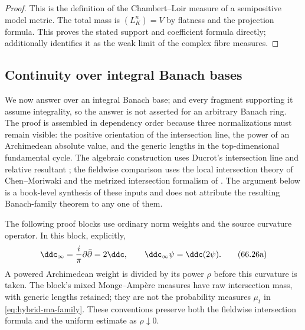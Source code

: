 \begin{proof}
This is the definition of the Chambert--Loir measure of a semipositive
model metric. The total mass is $(L_K^n)=V$ by flatness and the
projection formula. This proves the stated support and coefficient
formula directly;  additionally
identifies it as the weak limit of the complex fibre measures.
\end{proof}

\subsection{Continuity over integral Banach bases}
\label{sec:hybrid-banach-family-ma}

We now answer \cite[Question~4.9]{PS23Hybrid} over an integral Banach
base;  and every fragment supporting it assume
integrality, so the answer is not asserted for an arbitrary Banach ring.
The proof is assembled in dependency order because three normalizations
must remain visible: the positive orientation of the intersection line,
the power of an Archimedean absolute value, and the generic lengths in the
top-dimensional fundamental cycle.  The algebraic construction uses
Ducrot's intersection line and relative resultant
\cite{Ducrot97CubeIntersection}; the fieldwise comparison uses the local
intersection theory of Chen--Moriwaki
\cite{ChenMoriwaki21AdelicIntersection} and the metrized intersection
formalism of \cite{BE21}.  The argument below is a book-level synthesis of
these inputs and does not attribute the resulting Banach-family theorem to
any one of them.

The following proof blocks use ordinary norm weights and the source
curvature operator. In this block, explicitly,
\[
 \ddc_\infty=\frac{i}{\pi}\partial\bar\partial=2\ddc,
 \qquad \ddc_\infty\psi=\ddc(2\psi).
\tag{66.26a}\label{eq:hybrid-banach-curvature-conversion}
\]
A powered Archimedean weight is divided by its power $\rho$ before this
curvature is taken. The block's mixed Monge--Amp\`ere measures have raw
intersection mass, with generic lengths retained; they are not the
probability measures $\mu_t$ in \eqref{eq:hybrid-ma-family}. These
conventions preserve both the fieldwise intersection formula and the
uniform estimate as $\rho\downarrow0$.

\begingroup
\providecommand{\ph}{\operatorname{ph}}
\providecommand{\cR}{\mathcal R}
\providecommand{\R}{\mathbf R}
\providecommand{\C}{\mathbf C}
\providecommand{\eps}{\varepsilon}
\providecommand{\norm}[1]{\lVert#1\rVert}
\providecommand{\abs}[1]{\lvert#1\rvert}
\edef\savedPseventeenEquation{\number\value{equation}}
\renewcommand{\theequation}{66.P17.1.\arabic{equation}}
\renewcommand{\theHequation}{66.P17.1.\arabic{equation}}
\setcounter{equation}{0}


